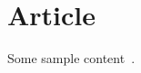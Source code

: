 \documentclass[
	pdftex,
	oneside,
	12pt
]{article}
\begin{document}
	

	\section*{Article}

	Some sample content~\cite{lit}.
  
    \printbibliography

	\clearpage
	
\end{document}
